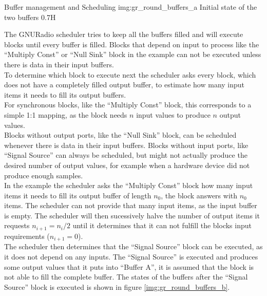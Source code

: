 \begin{subchapter}{Buffer management and Scheduling}
               {img:gr_round_buffers_a}
               {Initial state of the two buffers}
               {0.7}{H}

  The GNURadio scheduler tries to keep all the buffers filled
  and will execute blocks until every buffer is filled.
  Blocks that depend on input to process like the ``Multiply Const''
  or ``Null Sink'' block in the example can not be executed
  unless there is data in their input buffers. \\

  To determine which block to execute next the scheduler
  asks every block, which does not have a completely filled
  output buffer, to estimate how many input items it needs to fill
  its output buffers. \\

  For synchronous blocks, like the ``Multiply Const'' block,
  this corresponds to a simple 1:1 mapping, as the block
  needs $n$ input values to produce $n$ output values. \\

  Blocks without output ports, like the ``Null Sink'' block,
  can be scheduled whenever there is data in their input
  buffers.
  Blocks without input ports, like ``Signal Source'' can
  always be scheduled, but might not actually produce the
  desired number of output values, for example when a
  hardware device did not produce enough samples. \\

  In the example the scheduler asks the ``Multiply Const''
  block how many input items it needs to fill
  its output buffer of length $n_0$, the block answers with
  $n_0$ items.
  The scheduler can not provide that many input items,
  as the input buffer is empty.
  The scheduler will then sucessively halve the number
  of output items it requests $n_{i+1}=n_i/2$ until
  it determines that it can not fulfill the blocks
  input requirements ($n_{i+1}=0$). \\

  The scheduler then determines that the ``Signal Source''
  block can be executed, as it does not depend on any
  inputs.
  The ``Signal Source'' is executed and produces some
  output values that it puts into ``Buffer A'', it is assumed
  that the block is not able to fill the complete buffer.
  The states of the buffers after the ``Signal Source''
  block is executed is shown in figure \ref{img:gr_round_buffers_b}. \\


\end{subchapter}
